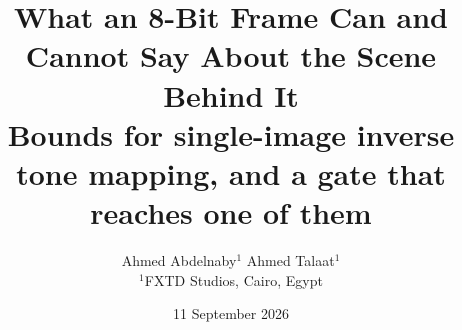 \documentclass[11pt]{article}
\title{What an 8-Bit Frame Can and Cannot Say About the Scene Behind It\\[0.4em]
\large Bounds for single-image inverse tone mapping, and a gate that reaches one of them}
\author{Ahmed Abdelnaby$^{1}$ \qquad Ahmed Talaat$^{1}$ \\[0.35em]
\normalsize $^{1}$FXTD Studios, Cairo, Egypt}
\date{11 September 2026}
\begin{document}
\maketitle

\begin{abstract}

\end{abstract}

















\appendix

\end{document}
